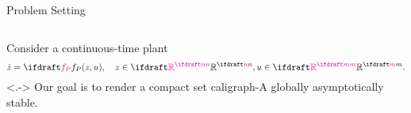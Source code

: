 \documentclass[notheorems, aspectratio=169, presentation]{beamer}
\begin{document}
\begin{frame}[t]{Problem Setting}
  \vspace{0pt}
  \begin{columns}
    \begin{column}[T]{0.45\textwidth}
      Consider a continuous-time plant 
      \begin{equation*}
          \dot z = \fp(z,u), \quad 
            z \in \plantstatespace, u \in \plantinputspace.
          \label{eq:plant}
      \end{equation*}
      \note<.->{
        Our goal is to render a compact set caligraph-A 
         globally asymptotically stable.
      }
      \medskip
      

\end{column}
\end{columns}
\end{frame}
\end{document}
